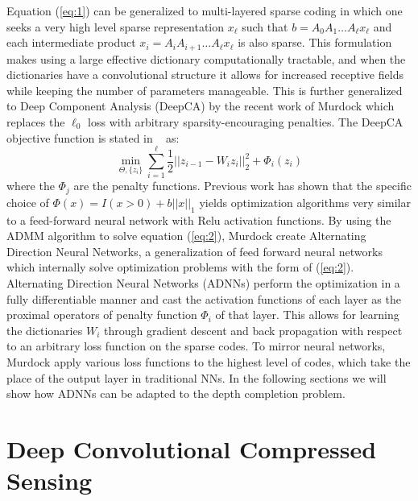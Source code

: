 Equation (\ref{eq:1}) can be generalized to multi-layered sparse coding in which one seeks a very high level sparse representation $x_{\ell}$ such that $b = A_0A_1\ldots A_{\ell}x_{\ell}$ and each intermediate product $x_i = A_iA_{i+1}\ldots A_{\ell}x_{\ell}$ is also sparse. This formulation makes using a large effective dictionary computationally tractable, and when the dictionaries have a convolutional structure it allows for increased receptive fields while keeping the number of parameters manageable. This is further generalized to Deep Component Analysis (DeepCA) by the recent work of Murdock \etal which replaces the $\ell_0$ loss with arbitrary sparsity-encouraging penalties. The DeepCA objective function is stated in ~\cite{} as:
\begin{equation}
  \label{eq:2}
  \min_{\Theta, \{z_i\}} \sum_{i=1}^{\ell} \frac{1}{2} \left|| z_{i-1} - W_iz_i\right||_2^2 + \Phi_i(z_i)
\end{equation}
where the $\Phi_j$ are the penalty functions. Previous work has shown that the specific choice of $\Phi(x) = I(x > 0) + b\left||x\right||_1$ yields optimization algorithms very similar to a feed-forward neural network with Relu activation functions. By using the ADMM algorithm to solve equation (\ref{eq:2}), Murdock \etal create Alternating Direction Neural Networks, a generalization of feed forward neural networks which internally solve optimization problems with the form of (\ref{eq:2}). Alternating Direction Neural Networks (ADNNs) perform the optimization in a fully differentiable manner and cast the activation functions of each layer as the proximal operators of penalty function $\Phi_i$ of that layer. This allows for learning the dictionaries $W_i$ through gradient descent and back propagation with respect to an arbitrary loss function on the sparse codes. To mirror neural networks, Murdock \etal apply various loss functions to the highest level of codes, which take the place of the output layer in traditional NNs. In the following sections we will show how ADNNs can be adapted to the depth completion problem.\\

\section{Deep Convolutional Compressed Sensing}
 


